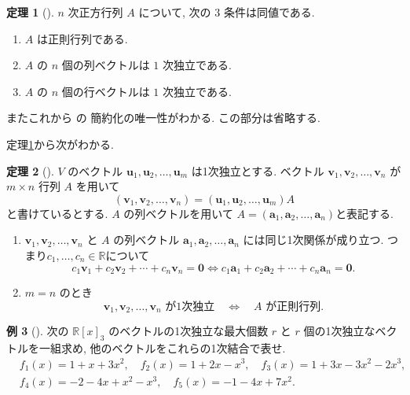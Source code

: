 \documentclass[dvipdfmx,a4paper,11pt]{article} %
\newcommand{\R}{\mathbb{R}}
\theoremstyle{definition}
\newtheorem{thm}{定理}[section]
\newtheorem{eg}[thm]{例}
\begin{document}
\begin{thm}[{\cite[定理4.3.4]{M}}] 
\label{thm-M-4.3.4}
\(n\) 次正方行列 \(A\) について, 次の \(3\) 条件は同値である.
\begin{enumerate}
\item[(1)] \(A\) は正則行列である.
\item[(2)] \(A\) の \(n\) 個の列ベクトルは \(1\) 次独立である.
\item[(3)] \(A\) の \(n\) 個の行ベクトルは \(1\) 次独立である.
\end{enumerate}
\end{thm}


またこれから {\cite[定理4.3.5]{M}} の 簡約化の唯一性がわかる. 
この部分は省略する. 

定理\ref{thm-M-4.3.4}から次がわかる.
\begin{thm}[{\cite[定理4.3.6]{M}}] 
\label{thm-M-4.3.6}
$V$ のベクトル $\bm{u}_1,\bm{u}_2,\ldots,\bm{u}_m$ は1次独立とする.
ベクトル $\bm{v}_1,\bm{v}_2,\ldots,\bm{v}_n$ が $m\times n$ 行列 $A$ を用いて
\[
(\bm{v}_1,\bm{v}_2,\ldots,\bm{v}_n)=(\bm{u}_1,\bm{u}_2,\ldots,\bm{u}_m)A
\]
と書けているとする.
$A$ の列ベクトルを用いて
$A=(\bm{a}_1,\bm{a}_2,\ldots,\bm{a}_n)$と表記する. 
\begin{enumerate}
\item[(1)] $\bm{v}_1,\bm{v}_2,\ldots,\bm{v}_n$ と $A$ の列ベクトル $\bm{a}_1,\bm{a}_2,\ldots,\bm{a}_n$ には同じ1次関係が成り立つ.
つまり$c_1, \ldots, c_n \in \R$について
$$
c_1\bm{v}_1+c_2\bm{v}_2+\cdots+c_n\bm{v}_n=\bm{0}
\iff
c_1\bm{a}_1+c_2\bm{a}_2+\cdots+c_n\bm{a}_n=\bm{0}.
$$
\item[(2)] $m=n$ のとき
\[
\bm{v}_1,\bm{v}_2,\ldots,\bm{v}_n\text{ が1次独立}
\quad\Longleftrightarrow\quad
A\text{ が正則行列}.
\]
\end{enumerate}
\end{thm}

\begin{eg}[{\cite[例題4.3.2]{M}}] 
次の $\mathbb{R}[x]_3$ のベクトルの1次独立な最大個数 $r$ と $r$ 個の1次独立なベクトルを一組求め, 他のベクトルをこれらの1次結合で表せ.
\[
\begin{aligned}
&f_1(x)=1+x+3x^2, \quad
f_2(x) =1+2x-x^3, \quad
f_3(x)=1+3x-3x^2-2x^3, \\
& f_4(x)=-2-4x+x^2-x^3,\quad
f_5(x)=-1-4x+7x^2.
\end{aligned}
\]
\end{eg}
\end{document}
